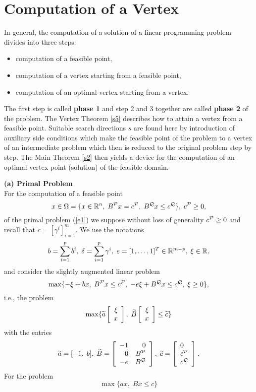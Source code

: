 \section{Computation of a Vertex}
In general, the computation of a solution of a linear programming problem
divides into three steps:
\begin{itemize}
\item
computation of a feasible point,
\item
computation of a vertex starting from a feasible point,
\item
computation of an optimal vertex starting from a vertex.
\end{itemize}
The first step is called {\bf phase 1} and step 2 and 3 together are called
{\bf phase 2} of the problem.  The Vertex Theorem \ref{s5} describes how to
attain a vertex from a feasible point.  Suitable search directions $s$ are
found here by introduction of auxiliary side conditions which make the feasible
point of the problem to a vertex of an intermediate problem which then is
reduced to the original problem step by step.  The Main Theorem \ref{s2} then
yields a device for the computation of an optimal vertex point (solution) of
the feasible domain.
\par
%
{\bf (a) Primal Problem} \hfill\\
For the computation of a feasible point
\[
x \in \Omega = \{x \in \Bbb{R}^n, \; B^{\P}x = c^{\P}, \; B^{\Q}x \leq
c^{\Q}\}, \; c^{\P} \geq 0, \]
of the primal problem (\ref{e1}) we suppose without loss of
generality  $c^{\P} \geq 0$ and recall that $c = [\gamma ^i]_{i=1}^m$. We use
the notations
\[
b = \sum_{i=1}^pb^i, \; \delta  = \sum_{i=1}^p\gamma ^i, \;
e = [1, \ldots, 1]^T \in \Bbb{R}^{m-p}, \; \xi  \in \Bbb{R},
\]
and consider the slightly augmented linear problem
%
\[
\max \{- \xi + bx, \; B^{\P}x \leq c^{\P}, \; -e\xi + B^{\Q}x \leq
c^{\Q}, \; \xi  \geq 0\},
\]
%
i.e., the problem
%
\begin{equation} \label{e20}
\max \{ \wi{a}
\ba{[}{r}\xi \\ x \ea{]}, \; \wi{B}
\ba{[}{r}\xi \\ x\ea{]}
\leq \wi{c}\}
\end{equation}
with the entries
\[
\wi{a} = [-1, \; b], \;
\wi{B} = \ba{[}{rr} -1 & 0\\0 & B^{\P}\\-e & B^{\Q}\ea{]}, \;
\wi{c} = \ba{[}{l} 0\\ c^{\P} \\ c^{\Q} \ea{]}.
\]
%
For the problem
\[
\max \{ax, \; Bx \leq c\}
\]
